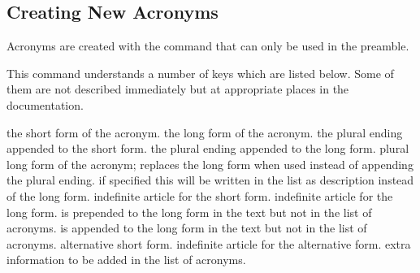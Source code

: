 \documentclass[DIV10,toc=index,toc=bib,hyperfootnotes=false]{cnpkgdoc}
\begin{document}
\subsection{Creating New Acronyms}
\noindent{}Acronyms are created with the command
 that can only be used in the preamble.
\begin{beschreibung}
\end{beschreibung}
This command understands a number of keys which are listed below. Some of them
are not described immediately but at appropriate places in the documentation.
\begin{beschreibung}
 \newline
   the short form of the acronym.
 \newline
   the long form of the acronym.
   the plural ending appended to the short form.
   the plural ending appended to the long form.
 \newline
   plural long form of the acronym; replaces the long form when used instead of
   appending the plural ending.
 \newline
   if specified this will be written in the list as
   description instead of the long form.
   indefinite article for the short form.
   indefinite article for the long form.
 \newline
    is prepended to the long form in the text but
   not in the list of acronyms.
 \newline
    is appended to the long form in the text but
   not in the list of acronyms.
 \newline
   alternative short form.
   indefinite article for the alternative form.
 \newline
   extra information to be added in the list of acronyms.

\end{beschreibung}
\end{document}

